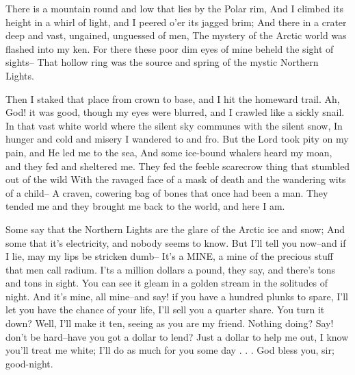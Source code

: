 \begin{poemblock}
 There is a mountain round and low that lies by the Polar rim,
 And I climbed its height in a whirl of light,
   and I peered o'er its jagged brim;
 And there in a crater deep and vast, ungained, unguessed of men,
 The mystery of the Arctic world was flashed into my ken.
 For there these poor dim eyes of mine beheld the sight of sights--
 That hollow ring was the source and spring of the mystic Northern Lights.

 Then I staked that place from crown to base, and I hit the homeward trail.
 Ah, God! it was good, though my eyes were blurred,
   and I crawled like a sickly snail.
 In that vast white world where the silent sky
   communes with the silent snow,
 In hunger and cold and misery I wandered to and fro.
 But the Lord took pity on my pain, and He led me to the sea,
 And some ice-bound whalers heard my moan, and they fed and sheltered me.
 They fed the feeble scarecrow thing that stumbled out of the wild
 With the ravaged face of a mask of death
   and the wandering wits of a child--
 A craven, cowering bag of bones that once had been a man.
 They tended me and they brought me back to the world, and here I am.

 Some say that the Northern Lights are the glare of the Arctic ice and snow;
 And some that it's electricity, and nobody seems to know.
 But I'll tell you now--and if I lie, may my lips be stricken dumb--
 It's a MINE, a mine of the precious stuff that men call radium.
 I'ts a million dollars a pound, they say,
   and there's tons and tons in sight.
 You can see it gleam in a golden stream in the solitudes of night.
 And it's mine, all mine--and say! if you have a hundred plunks to spare,
 I'll let you have the chance of your life, I'll sell you a quarter share.
 You turn it down?  Well, I'll make it ten, seeing as you are my friend.
 Nothing doing?  Say! don't be hard--have you got a dollar to lend?
 Just a dollar to help me out, I know you'll treat me white;
 I'll do as much for you some day . . . God bless you, sir; good-night.
\end{poemblock}
